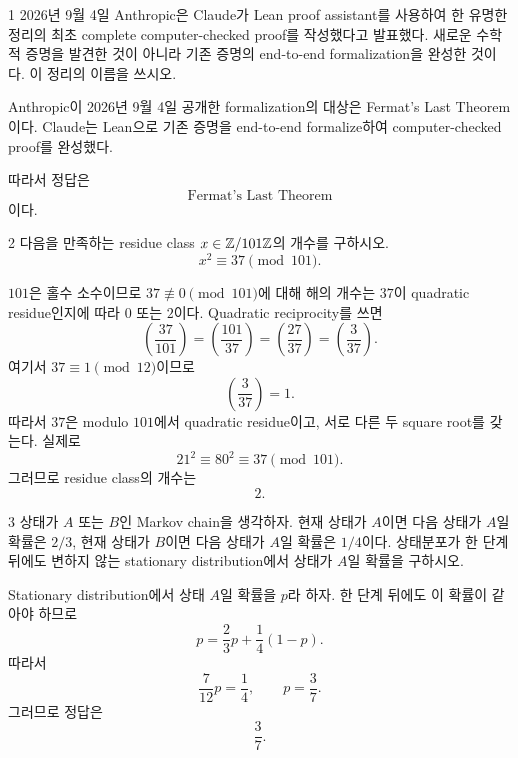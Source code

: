 
\begin{problem}{1}
2026년 9월 4일 Anthropic은 Claude가 Lean proof assistant를 사용하여 한 유명한 정리의 최초 complete computer-checked proof를 작성했다고 발표했다. 새로운 수학적 증명을 발견한 것이 아니라 기존 증명의 end-to-end formalization을 완성한 것이다. 이 정리의 이름을 쓰시오.
\end{problem}

\begin{solution}
Anthropic이 2026년 9월 4일 공개한 formalization의 대상은 Fermat's Last Theorem이다. Claude는 Lean으로 기존 증명을 end-to-end formalize하여 computer-checked proof를 완성했다.

따라서 정답은
\[
    \boxed{\text{Fermat's Last Theorem}}
\]
이다.
\end{solution}

\begin{problem}{2}
다음을 만족하는 residue class $x\in\mathbb{Z}/101\mathbb{Z}$의 개수를 구하시오.
\[
    x^2\equiv37\pmod{101}.
\]
\end{problem}

\begin{solution}
$101$은 홀수 소수이므로 $37\not\equiv0\pmod{101}$에 대해 해의 개수는 $37$이 quadratic residue인지에 따라 $0$ 또는 $2$이다. Quadratic reciprocity를 쓰면
\[
    \left(\frac{37}{101}\right)
    =
    \left(\frac{101}{37}\right)
    =
    \left(\frac{27}{37}\right)
    =
    \left(\frac{3}{37}\right).
\]
여기서 $37\equiv1\pmod{12}$이므로
\[
    \left(\frac{3}{37}\right)=1.
\]
따라서 $37$은 modulo $101$에서 quadratic residue이고, 서로 다른 두 square root를 갖는다. 실제로
\[
    21^2\equiv80^2\equiv37\pmod{101}.
\]
그러므로 residue class의 개수는
\[
    \boxed{2}.
\]
\end{solution}

\begin{problem}{3}
상태가 $A$ 또는 $B$인 Markov chain을 생각하자. 현재 상태가 $A$이면 다음 상태가 $A$일 확률은 $2/3$, 현재 상태가 $B$이면 다음 상태가 $A$일 확률은 $1/4$이다. 상태분포가 한 단계 뒤에도 변하지 않는 stationary distribution에서 상태가 $A$일 확률을 구하시오.
\end{problem}

\begin{solution}
Stationary distribution에서 상태 $A$일 확률을 $p$라 하자. 한 단계 뒤에도 이 확률이 같아야 하므로
\[
    p
    =
    \frac23p+\frac14(1-p).
\]
따라서
\[
    \frac{7}{12}p=\frac14,
    \qquad
    p=\frac37.
\]
그러므로 정답은
\[
    \boxed{\frac37}.
\]
\end{solution}

